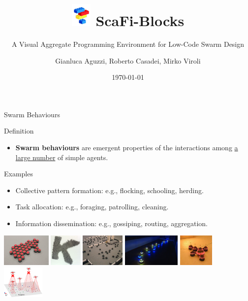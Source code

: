 \documentclass[aspectratio=169]{beamer}
\title{\includegraphics[width=1cm]{img/scafiblocks-logo.png} ScaFi-Blocks}
\subtitle{A Visual Aggregate Programming Environment for Low-Code Swarm Design}
\date{\today}
\author{\alert{Gianluca Aguzzi}, Roberto Casadei, Mirko Viroli}
\institute{University of Bologna, Cesena \\ Talk @ \alert{COORDINATION 2024}}
\begin{document}
  \maketitle

  \begin{frame}[fragile]{Swarm Behaviours}

	\begin{alertblock}{Definition}
		\begin{itemize}
			\item 
			\textbf{Swarm behaviours} are emergent properties of the interactions among \underline{a large number} of simple agents.
		
		\end{itemize}
	\end{alertblock}
	\begin{exampleblock}{Examples}
		\begin{itemize}
			\item Collective pattern formation: e.g., flocking, schooling, herding.
			\item Task allocation: e.g., foraging, patrolling, cleaning.
			\item Information dissemination: e.g., gossiping, routing, aggregation.
		\end{itemize}

	\end{exampleblock}
	\begin{center}
	\includegraphics[height=1.6cm]{img/aggregation.jpg}
	\includegraphics[height=1.6cm]{img/pattern-formation.png}
	\includegraphics[height=1.6cm]{img/exploration.jpg}
	\includegraphics[height=1.6cm]{img/navigation.jpg}
	\includegraphics[height=1.6cm]{img/transportation.jpeg}
	\includegraphics[height=1.6cm]{img/localization.png}
	\end{center}
	\end{frame}
\end{document}
